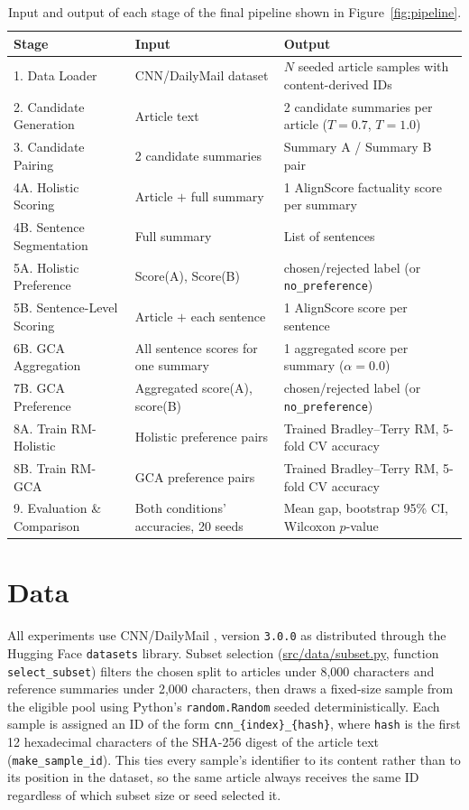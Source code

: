 \begin{table}[htbp]
\centering
\caption[Input and output of each pipeline stage]{Input and output of each stage of the final pipeline shown in Figure~\ref{fig:pipeline}.}
\label{tab:pipeline-io}
\begin{tabularx}{\textwidth}{lXX}
\toprule
Stage & Input & Output \\
\midrule
1. Data Loader & CNN/DailyMail dataset & $N$ seeded article samples with content-derived IDs \\
2. Candidate Generation & Article text & 2 candidate summaries per article ($T{=}0.7$, $T{=}1.0$) \\
3. Candidate Pairing & 2 candidate summaries & Summary A / Summary B pair \\
4A. Holistic Scoring & Article $+$ full summary & 1 AlignScore factuality score per summary \\
4B. Sentence Segmentation & Full summary & List of sentences \\
5A. Holistic Preference & Score(A), Score(B) & chosen/rejected label (or \texttt{no\_preference}) \\
5B. Sentence-Level Scoring & Article $+$ each sentence & 1 AlignScore score per sentence \\
6B. GCA Aggregation & All sentence scores for one summary & 1 aggregated score per summary ($\alpha{=}0.0$) \\
7B. GCA Preference & Aggregated score(A), score(B) & chosen/rejected label (or \texttt{no\_preference}) \\
8A. Train RM-Holistic & Holistic preference pairs & Trained Bradley--Terry RM, 5-fold CV accuracy \\
8B. Train RM-GCA & GCA preference pairs & Trained Bradley--Terry RM, 5-fold CV accuracy \\
9. Evaluation \& Comparison & Both conditions' accuracies, 20 seeds & Mean gap, bootstrap 95\% CI, Wilcoxon $p$-value \\
\bottomrule
\end{tabularx}
\end{table}

\section{Data}
\label{sec:impl-data}

All experiments use CNN/DailyMail \citep{hermann2015teaching}, version \texttt{3.0.0}
as distributed through the Hugging Face \texttt{datasets} library. Subset selection
(\url{src/data/subset.py}, function \texttt{select\_subset}) filters the chosen
split to articles under 8{,}000 characters and reference summaries under 2{,}000
characters, then draws a fixed-size sample from the eligible pool using Python's
\texttt{random.Random} seeded deterministically. Each sample is assigned an ID of
the form \texttt{cnn\_\{index\}\_\{hash\}}, where \texttt{hash} is the first 12
hexadecimal characters of the SHA-256 digest of the article text
(\texttt{make\_sample\_id}). This ties every sample's identifier to its content
rather than to its position in the dataset, so the same article always receives the
same ID regardless of which subset size or seed selected it.

